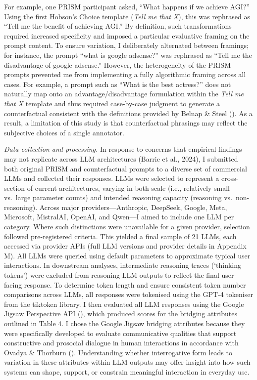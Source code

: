 \documentclass[
  12pt,
]{article}
\begin{document}
For example, one PRISM participant asked, ``What happens if we achieve AGI?'' Using the first Hobson's Choice template (\emph{Tell me that X}), this was rephrased as ``Tell me the benefit of achieving AGI.'' By definition, such transformations required increased specificity and imposed a particular evaluative framing on the prompt content. To ensure variation, I deliberately alternated between framings; for instance, the prompt ``what is google adsense?'' was rephrased as ``Tell me the disadvantage of google adsense.'' However, the heterogeneity of the PRISM prompts prevented me from implementing a fully algorithmic framing across all cases. For example, a prompt such as ``What is the best actress?'' does not naturally map onto an advantage/disadvantage formulation within the \emph{Tell me that X} template and thus required case-by-case judgment to generate a counterfactual consistent with the definitions provided by Belnap \& Steel (). As a result, a limitation of this study is that counterfactual phrasings may reflect the subjective choices of a single annotator.

\emph{Data collection and processing.} In response to concerns that empirical findings may not replicate across LLM architectures (Barrie et al., 2024), I submitted both original PRISM and counterfactual prompts to a diverse set of commercial LLMs and collected their responses. LLMs were selected to represent a cross-section of current architectures, varying in both scale (i.e., relatively small vs.~large parameter counts) and intended reasoning capacity (reasoning vs.~non-reasoning). Across major providers---Anthropic, DeepSeek, Google, Meta, Microsoft, MistralAI, OpenAI, and Qwen---I aimed to include one LLM per category. Where such distinctions were unavailable for a given provider, selection followed pre-registered criteria. This yielded a final sample of 21 LLMs, each accessed via provider APIs (full LLM versions and provider details in Appendix M). All LLMs were queried using default parameters to approximate typical user interactions. In downstream analyses, intermediate reasoning traces (`thinking tokens') were excluded from reasoning LLM outputs to reflect the final user-facing response. To determine token length and ensure consistent token number comparisons across LLMs, all responses were tokenised using the GPT-4 tokeniser from the tiktoken library. I then evaluated all LLM responses using the Google Jigsaw Perspective API (), which produced scores for the bridging attributes outlined in Table 4. I chose the Google Jigsaw bridging attributes because they were specifically developed to evaluate communicative qualities that support constructive and prosocial dialogue in human interactions in accordance with Ovadya \& Thorburn (). Understanding whether interrogative form leads to variation in these attributes within LLM outputs may offer insight into how such systems can shape, support, or constrain meaningful interaction in everyday use.
\end{document}
